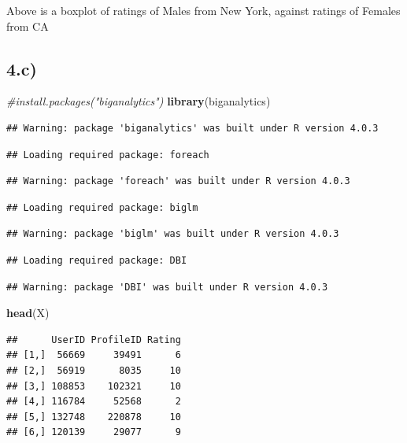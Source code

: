 \documentclass[
]{article}
\newenvironment{Shaded}{\begin{snugshade}}{\end{snugshade}}
\newcommand{\CommentTok}[1]{\textcolor[rgb]{0.56,0.35,0.01}{\textit{#1}}}
\newcommand{\KeywordTok}[1]{\textcolor[rgb]{0.13,0.29,0.53}{\textbf{#1}}}
\newcommand{\NormalTok}[1]{#1}
\begin{document}
Above is a boxplot of ratings of Males from New York, against ratings of
Females from CA

\hypertarget{c-1}{%
\subsection{4.c)}\label{c-1}}

\begin{Shaded}
\begin{Highlighting}[]
\CommentTok{#install.packages("biganalytics")}
\KeywordTok{library}\NormalTok{(biganalytics)}
\end{Highlighting}
\end{Shaded}

\begin{verbatim}
## Warning: package 'biganalytics' was built under R version 4.0.3
\end{verbatim}

\begin{verbatim}
## Loading required package: foreach
\end{verbatim}

\begin{verbatim}
## Warning: package 'foreach' was built under R version 4.0.3
\end{verbatim}

\begin{verbatim}
## Loading required package: biglm
\end{verbatim}

\begin{verbatim}
## Warning: package 'biglm' was built under R version 4.0.3
\end{verbatim}

\begin{verbatim}
## Loading required package: DBI
\end{verbatim}

\begin{verbatim}
## Warning: package 'DBI' was built under R version 4.0.3
\end{verbatim}

\begin{Shaded}
\begin{Highlighting}[]
\KeywordTok{head}\NormalTok{(X)}
\end{Highlighting}
\end{Shaded}

\begin{verbatim}
##      UserID ProfileID Rating
## [1,]  56669     39491      6
## [2,]  56919      8035     10
## [3,] 108853    102321     10
## [4,] 116784     52568      2
## [5,] 132748    220878     10
## [6,] 120139     29077      9
\end{verbatim}
\end{document}
